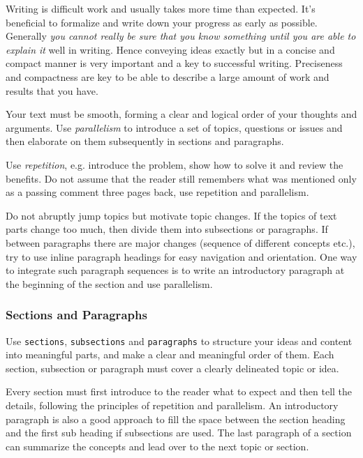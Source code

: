 \documentclass[11pt, a4paper,oneside,chapterprefix=false]{scrbook}
\begin{document}
Writing is difficult work and usually takes more time than expected. It's beneficial to formalize and write down your progress as early as possible. Generally \emph{you cannot really be sure that you know something until you are able to explain it} well in writing. Hence conveying ideas exactly but in a concise and compact manner is very important and a key to successful writing. Preciseness and compactness are key to be able to describe a large amount of work and results that you have.

Your text must be smooth, forming a clear and logical order of your thoughts and arguments. Use \emph{parallelism} to introduce a set of topics, questions or issues and then elaborate on them subsequently in sections and paragraphs.

Use \emph{repetition}, e.g. introduce the problem, show how to solve it and review the benefits. Do not assume that the reader still remembers what was mentioned only as a passing comment three pages back, use repetition and parallelism.

Do not abruptly jump topics but motivate topic changes. If the topics of text parts change too much, then divide them into subsections or paragraphs. If between paragraphs there are major changes (sequence of different concepts etc.), try to use inline paragraph headings for easy navigation and orientation. One way to integrate such paragraph sequences is to write an introductory paragraph at the beginning of the section and use parallelism.

\subsubsection*{Sections and Paragraphs}

Use \texttt{sections}, \texttt{subsections} and \texttt{paragraphs} to structure your ideas and content into meaningful parts, and make a clear and meaningful order of them. Each section, subsection or paragraph must cover a clearly delineated topic or idea.

Every section must first introduce to the reader what to expect and then tell the details, following the principles of repetition and parallelism. An introductory paragraph is also a good approach to fill the space between the section heading and the first sub heading if subsections are used. The last paragraph of a section can summarize the concepts and lead over to the next topic or section.
\end{document}
